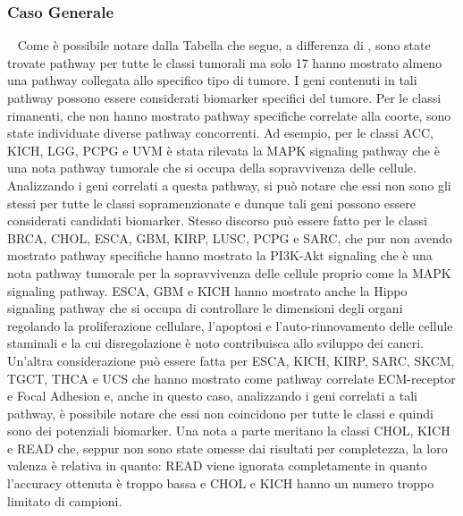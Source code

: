 \subsubsection{Caso Generale}~\newline
\label{sssec:bio-val-net}
Come è possibile notare dalla Tabella che segue, a differenza di \cite{lyu2018deep}, sono state trovate pathway per
tutte le classi tumorali ma solo 17 hanno mostrato almeno una pathway collegata allo specifico tipo 
di tumore. I geni contenuti in tali pathway possono essere considerati biomarker specifici del tumore.
Per le classi rimanenti, che non hanno mostrato pathway specifiche correlate alla coorte, sono state
individuate diverse pathway concorrenti. Ad esempio, per le classi ACC, KICH, LGG, PCPG e UVM
è stata rilevata la MAPK signaling pathway che è una nota pathway tumorale che si occupa della sopravvivenza
delle cellule. Analizzando i geni correlati a questa pathway, si può notare che essi non sono gli stessi
per tutte le classi sopramenzionate e dunque tali geni possono essere considerati candidati biomarker.
Stesso discorso può essere fatto per le classi BRCA, CHOL, ESCA, GBM, KIRP, LUSC, PCPG e SARC, che pur non avendo 
mostrato pathway specifiche hanno mostrato la PI3K-Akt signaling che è una nota pathway tumorale per la
sopravvivenza delle cellule proprio come la MAPK signaling pathway. ESCA, GBM e KICH hanno mostrato anche la Hippo
signaling pathway che si occupa di controllare le dimensioni degli organi regolando la proliferazione cellulare, 
l'apoptosi e l'auto-rinnovamento delle cellule staminali e la cui disregolazione è noto contribuisca allo sviluppo 
dei cancri.   
Un'altra considerazione può essere fatta per ESCA, KICH, KIRP, SARC, SKCM, TGCT, THCA e UCS che hanno mostrato
come pathway correlate ECM-receptor e Focal Adhesion e, anche in questo caso, analizzando i geni
correlati a tali pathway, è possibile notare che essi non coincidono per tutte le classi e quindi sono
dei potenziali biomarker.
Una nota a parte meritano la classi CHOL, KICH e READ che, seppur non sono state omesse dai risultati per completezza, 
la loro valenza è relativa in quanto: READ viene ignorata completamente in quanto l'accuracy ottenuta è troppo bassa 
e CHOL e KICH hanno un numero troppo limitato di campioni.
    
